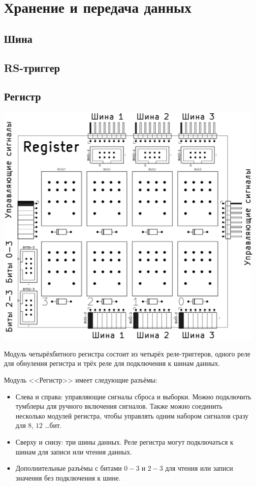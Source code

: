 

\chapter{Хранение и передача данных}

\section{Шина}


\section{RS-триггер}


\section{Регистр}

\begin{center}
\includegraphics{boards/register.png}
\end{center}

Модуль четырёхбитного регистра состоит из четырёх реле-триггеров,
одного реле для обнуления регистра и трёх реле для подключения
к шинам данных.

Модуль <<Регистр>> имеет следующие разъёмы:
\begin{itemize}
  \item Слева и справа: управляющие сигналы сброса и выборки.
        Можно подключить тумблеры
        для ручного включения сигналов. Также можно соединить несколько
        модулей регистра, чтобы управлять одним набором сигналов сразу
        для $8$, $12$ \ldots бит.
  \item Сверху и снизу: три шины данных. Реле регистра могут
        подключаться к шинам для записи или чтения данных.
  \item Дополнительные разъёмы с битами $0-3$ и $2-3$ для чтения или
        записи значения без подключения к шине.
\end{itemize}

